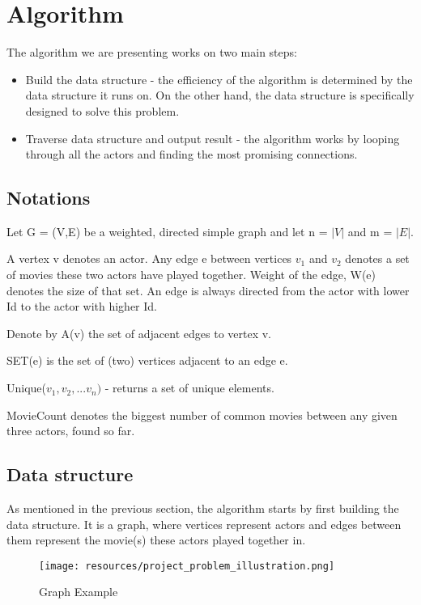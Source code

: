 \section{Algorithm}
\label{Algorithm}

The algorithm we are presenting works on two main steps:
\begin{itemize}
  \item Build the data structure - the efficiency of the algorithm is determined by the data structure it runs on. On the other hand, the data structure is specifically designed to solve this problem.
  \item Traverse data structure and output result - the algorithm works by looping through all the actors and finding the most promising connections.
\end{itemize} 

\subsection{Notations}
Let G = (V,E) be a weighted, directed simple graph and let n = \(\lvert V\rvert\) and m = \(\lvert E\rvert\).

A vertex v denotes an actor. Any edge e between vertices \(v_1\) and \(v_2\) denotes a set of movies these two actors have played together. Weight of the edge, W(e) denotes the size of that set. An edge is always directed from the actor with lower Id to the actor with higher Id.

Denote by A(v) the set of adjacent edges to vertex v.

SET(e) is the set of (two) vertices adjacent to an edge e.

Unique(\(v_1, v_2,... v_n)\) - returns a set of unique elements.

MovieCount denotes the biggest number of common movies between any given three actors, found so far.

\subsection{Data structure}
As mentioned in the previous section, the algorithm starts by first building the data structure. It is a graph, where vertices represent actors and edges between them represent the movie(s) these actors played together in. 

\begin{figure}[ht!]
\centering
\texttt{[image: resources/project\_problem\_illustration.png]}
\caption{Graph Example}
\label{example}
\end{figure}

